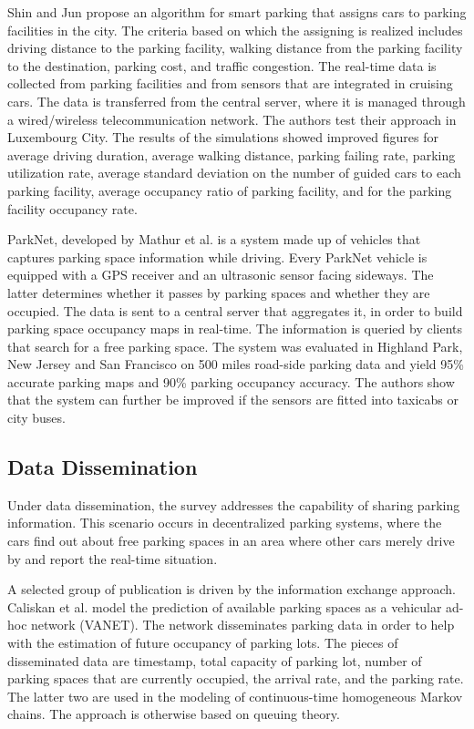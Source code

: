 	Shin and Jun  propose an algorithm for smart parking that assigns cars to parking facilities in the city. The criteria based on which the assigning is realized includes driving distance to the parking facility, walking distance from the parking facility to the destination, parking cost, and traffic congestion. The real-time data is collected from parking facilities and from sensors that are integrated in cruising cars. The data is transferred from the central server, where it is managed through a wired/wireless telecommunication network. The authors test their approach in Luxembourg City. The results of the simulations showed improved figures for average driving duration, average walking distance, parking failing rate, parking utilization rate, average standard deviation on the number of guided cars to each parking facility, average occupancy ratio of parking facility, and for the parking facility occupancy rate. 
	
	ParkNet, developed by Mathur et al.  is a system made up of vehicles that captures parking space information while driving. Every ParkNet vehicle is equipped with a GPS receiver and an ultrasonic sensor facing sideways. The latter determines whether it passes by parking spaces and whether they are occupied. The data is sent to a central server that aggregates it, in order to build parking space occupancy maps in real-time. The information is queried by clients that search for a free parking space. The system was evaluated in Highland Park, New Jersey and San Francisco on 500 miles road-side parking data and yield 95\% accurate parking maps and 90\% parking occupancy accuracy. The authors show that the system can further be improved if the sensors are fitted into taxicabs or city buses.
	
	\subsection{Data Dissemination}
	Under data dissemination, the survey addresses the capability of sharing parking information. This scenario occurs in decentralized parking systems, where the cars find out about free parking spaces in an area where other cars merely drive by and report the real-time situation. 
	
	A selected group of publication is driven by the information exchange approach. Caliskan et al.  model the prediction of available parking spaces as a vehicular ad-hoc network (VANET). The network disseminates parking data in order to help with the estimation of future occupancy of parking lots. The pieces of disseminated data are timestamp, total capacity of parking lot, number of parking spaces that are currently occupied, the arrival rate, and the parking rate. The latter two are used in the modeling of continuous-time homogeneous Markov chains. The approach is otherwise based on queuing theory. 
	
